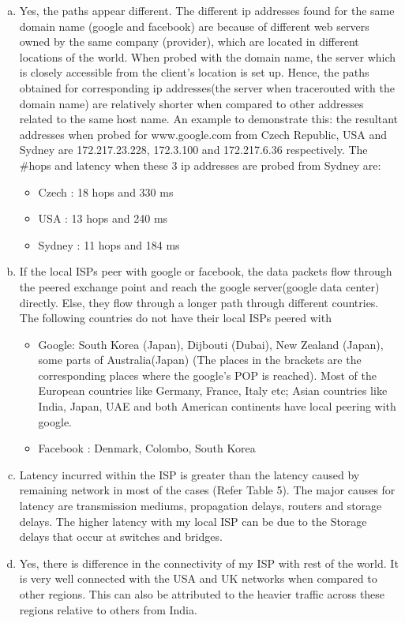 \documentclass{article}
\begin{document}
\begin{enumerate}[a)]
\begin{itemize}
        \end{itemize}{}
        \item Yes, the paths appear different. The different ip addresses found for the same domain name (google and facebook) are because of different web servers owned by the same company (provider), which are located in different locations of the world. When probed with the domain name, the server which is closely accessible from the client's location is set up.
        Hence, the paths obtained for corresponding ip addresses(the server when tracerouted with the domain name) are relatively shorter when compared to other addresses related to the same host name.
        An example to demonstrate this: the resultant addresses when probed for www.google.com from Czech Republic, USA and Sydney are 172.217.23.228, 172.3.100 and 172.217.6.36 respectively. The \#hops and latency when these 3 ip addresses are probed from Sydney are:
        \begin{itemize}
            \item Czech : 18 hops and 330 ms
            \item USA : 13 hops and 240 ms
            \item Sydney : 11 hops and 184 ms
        \end{itemize}{}
        \item If the local ISPs peer with google or facebook, the data packets flow through the peered exchange point and reach the google server(google data center) directly. Else, they flow through a longer path through different countries. The following countries do not have their local ISPs peered with
        \begin{itemize}
            \item Google: South Korea (Japan), Dijbouti (Dubai), New Zealand (Japan), some parts of Australia(Japan) (The places in the brackets are the corresponding places where the google's POP is reached). Most of the European countries like Germany, France, Italy etc; Asian countries like India, Japan, UAE and both American continents have local peering with google.
            \item Facebook : Denmark, Colombo, South Korea
        \end{itemize}
        \item Latency incurred within the ISP is greater than the latency caused by remaining network in most of the cases (Refer Table 5). The major causes for latency are transmission mediums, propagation delays, routers and storage delays. The higher latency with my local ISP can be due to the Storage delays that occur at switches and bridges.
        \item Yes, there is difference in the connectivity of my ISP with rest of the world. It is very well connected with the USA and UK networks when compared to other regions. This can also be attributed to the heavier traffic across these regions relative to others from India.
    \end{enumerate}{}
\end{document}
